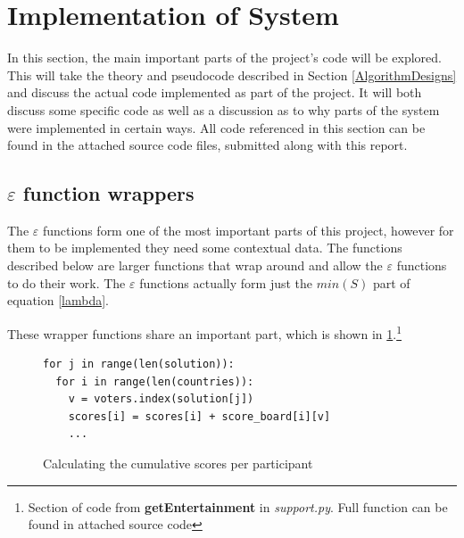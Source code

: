 \documentclass[12pt]{report}
\begin{document}
\section{Implementation of System}\label{Implementation}
In this section, the main important parts of the project's code will be explored. This will take the theory and pseudocode described in Section \ref{AlgorithmDesigns} and discuss the actual code implemented as part of the project. It will both discuss some specific code as well as a discussion as to why parts of the system were implemented in certain ways. All code referenced in this section can be found in the attached source code files, submitted along with this report.

\subsection{$\varepsilon$ function wrappers}\label{Imp-Ewrappers}
The $\varepsilon$ functions form one of the most important parts of this project, however for them to be implemented they need some contextual data. The functions described below are larger functions that wrap around and allow the $\varepsilon$ functions to do their work. The $\varepsilon$ functions actually form just the $min(S)$ part of equation \ref{lambda}. 

These wrapper functions share an important part, which is shown in \ref{findScores}.\footnote{Section of code from \textbf{getEntertainment} in \textit{support.py}. Full function can be found in attached source code}

\begin{figure}[H]
\caption{Calculating the cumulative scores per participant}
\label{findScores}
\begin{lstlisting}
for j in range(len(solution)):
  for i in range(len(countries)):
    v = voters.index(solution[j])
    scores[i] = scores[i] + score_board[i][v]
    ...
\end{lstlisting}
\end{figure}
\end{document}
